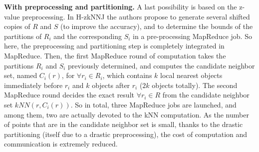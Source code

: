

\textbf{With preprocessing and partitioning.} 
A last possibility is based on the z-value preprocessing.
In H-zkNNJ \cite{Zhang:2012:EPK:2247596.2247602} the authors propose to generate several shifted copies of $R$ and $S$ (to improve the 
accuracy), and to determine the bounds of the partitions of $R_i$ and the 
corresponding $S_i$ in a pre-processing MapReduce job. So here, the preprocessing and partitioning step is completely integrated in MapReduce. Then, the first MapReduce round of computation takes the partitions $R_i$ and $S_i$ previously determined, and computes the candidate neighbor set, named 
$C_i\left(r\right)$,  for $\forall r_i \in R_i$, which contains $k$ local nearest objects immediately before $r_i$ and $k$ objects after $r_i$ ($2k$ objects totally). %
The second MapReduce round decides the exact result $\forall r_i \in R$ from the candidate neighbor set $kNN\left(r, C_i\left(r\right)\right)$.
So in total, three MapReduce jobs are launched, and among them, two are actually devoted to the kNN computation. As the number of points that are in the candidate neighbor set is small, thanks to the drastic partitioning (itself due to a drastic preprocessing), the cost of computation and communication is extremely reduced.
